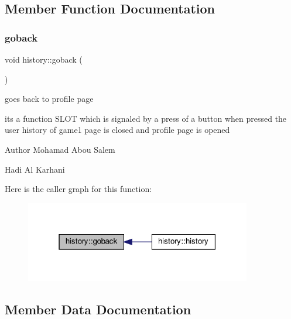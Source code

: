 \subsection{Member Function Documentation}
\mbox{\label{classhistory_ab0427d7cf35a054fc4ceff78068146bf}} 
\subsubsection{\texorpdfstring{goback}{goback}}
{\footnotesize\ttfamily void history\+::goback (\begin{DoxyParamCaption}{ }\end{DoxyParamCaption})\hspace{0.3cm}{\ttfamily [slot]}}



goes back to profile page 

its a function S\+L\+OT which is signaled by a press of a button when pressed the user history of game1 page is closed and profile page is opened

\begin{DoxyAuthor}{Author}
Mohamad Abou Salem 

Hadi Al Karhani 
\end{DoxyAuthor}
Here is the caller graph for this function\+:
\nopagebreak
\begin{figure}[H]
\begin{center}
\leavevmode
\includegraphics[width=280pt]{classhistory_ab0427d7cf35a054fc4ceff78068146bf_icgraph}
\end{center}
\end{figure}


\subsection{Member Data Documentation}
\mbox{\label{classhistory_a2eace55afb59f9bd4681ad8cb3ea4deb}} 

